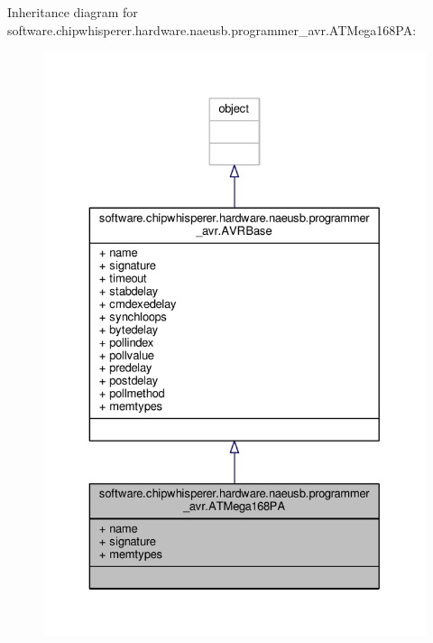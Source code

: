 Inheritance diagram for software.\+chipwhisperer.\+hardware.\+naeusb.\+programmer\+\_\+avr.\+A\+T\+Mega168\+P\+A\+:\nopagebreak
\begin{figure}[H]
\begin{center}
\leavevmode
\includegraphics[width=329pt]{df/dbb/classsoftware_1_1chipwhisperer_1_1hardware_1_1naeusb_1_1programmer__avr_1_1ATMega168PA__inherit__graph}
\end{center}
\end{figure}


